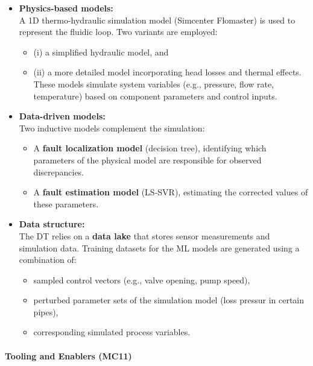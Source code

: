 \documentclass[
]{article}
\providecommand{\tightlist}{%
  \setlength{\itemsep}{0pt}\setlength{\parskip}{0pt}}
\begin{document}
\begin{itemize}
\item
  \textbf{Physics-based models:}\\
  A 1D thermo-hydraulic simulation model (Simcenter Flomaster) is used
  to represent the fluidic loop. Two variants are employed:

  \begin{itemize}
  \tightlist
  \item
    (i) a simplified hydraulic model, and
  \item
    (ii) a more detailed model incorporating head losses and thermal
    effects.\\
    These models simulate system variables (e.g., pressure, flow rate,
    temperature) based on component parameters and control inputs.
  \end{itemize}
\item
  \textbf{Data-driven models:}\\
  Two inductive models complement the simulation:

  \begin{itemize}
  \tightlist
  \item
    A \textbf{fault localization model} (decision tree), identifying
    which parameters of the physical model are responsible for observed
    discrepancies.
  \item
    A \textbf{fault estimation model} (LS‑SVR), estimating the corrected
    values of these parameters.
  \end{itemize}
\item
  \textbf{Data structure:}\\
  The DT relies on a \textbf{data lake} that stores sensor measurements
  and simulation data. Training datasets for the ML models are generated
  using a combination of:

  \begin{itemize}
  \tightlist
  \item
    sampled control vectors (e.g., valve opening, pump speed),
  \item
    perturbed parameter sets of the simulation model (loss pressur in
    certain pipes),
  \item
    corresponding simulated process variables.
  \end{itemize}
\end{itemize}

\paragraph{Tooling and Enablers (MC11)}\label{tooling-and-enablers-mc11}
\end{document}
